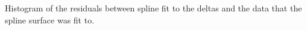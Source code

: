 Histogram of the residuals between spline fit to the deltas and the data that the spline surface was fit to. \label{spline_resid}
